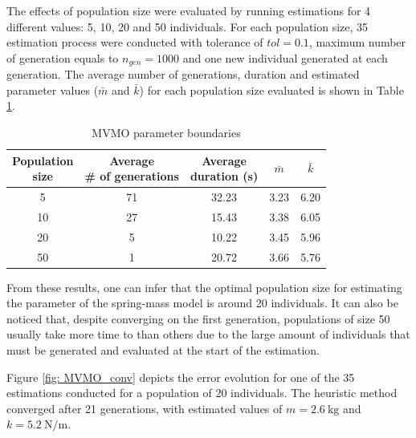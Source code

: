 The effects of population size were evaluated by running estimations for 4 different values: 5, 10, 20 and 50 individuals. For each population size, 35 estimation process were conducted with tolerance of $tol = 0.1$, maximum number of generation equals to $n_{gen}=1000$ and one new individual generated at each generation. The average number of generations, duration and estimated parameter values ($\bar{m}$ and $\bar{k}$) for each population size evaluated is shown in Table \ref{tab: spring_mass_MVMO_size}.

\begin{table}[!h]
	\centering
	\caption{MVMO parameter boundaries}
	\begin{tabular}{c|cccc}
		\shortstack{Population \\ size} & \shortstack{Average \\ \# of generations} & \shortstack{Average \\ duration (s)} & $\bar{m}$ & $\bar{k}$ \\
		\hline
		5 & 71 & 32.23 & 3.23 & 6.20 \\
		10 & 27 & 15.43 & 3.38 & 6.05 \\
		20 & 5 & 10.22 & 3.45 & 5.96 \\
		50 & 1 & 20.72 & 3.66 & 5.76 \\
	\end{tabular}
	\label{tab: spring_mass_MVMO_size}
\end{table}

From these results, one can infer that the optimal population size for estimating the parameter of the spring-mass model is around 20 individuals. It can also be noticed that, despite converging on the first generation, populations of size 50 usually take more time to than others due to the large amount of individuals that must be generated and evaluated at the start of the estimation.

Figure \ref{fig: MVMO_conv} depicts the error evolution for one of the 35 estimations conducted for a population of 20 individuals. The heuristic method converged after 21 generations, with estimated values of $m=2.6\ \text{kg}$ and $k=5.2\ \text{N/m}$.

